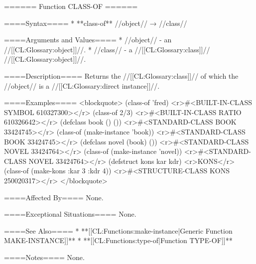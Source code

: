 ====== Function CLASS-OF ======

====Syntax====
  * **class-of** //object// → //class//

====Arguments and Values====
  * //object// - an //[[CL:Glossary:object]]//.
  * //class// - a //[[CL:Glossary:class]]// //[[CL:Glossary:object]]//.

====Description====
Returns the //[[CL:Glossary:class]]// of which the //object// is a //[[CL:Glossary:direct instance]]//.

====Examples====
<blockquote>
(class-of 'fred) <r>#<BUILT-IN-CLASS SYMBOL 610327300></r>
(class-of 2/3) <r>#<BUILT-IN-CLASS RATIO 610326642></r>
(defclass book () ()) <r>#<STANDARD-CLASS BOOK 33424745></r>
(class-of (make-instance 'book)) <r>#<STANDARD-CLASS BOOK 33424745></r>
(defclass novel (book) ()) <r>#<STANDARD-CLASS NOVEL 33424764></r>
(class-of (make-instance 'novel)) <r>#<STANDARD-CLASS NOVEL 33424764></r>
(defstruct kons kar kdr) <r>KONS</r>
(class-of (make-kons :kar 3 :kdr 4)) <r>#<STRUCTURE-CLASS KONS 250020317></r>
</blockquote>

====Affected By====
None.

====Exceptional Situations====
None.

====See Also====
  * **[[CL:Functions:make-instance|Generic Function MAKE-INSTANCE]]**
  * **[[CL:Functions:type-of|Function TYPE-OF]]**

====Notes====
None.

